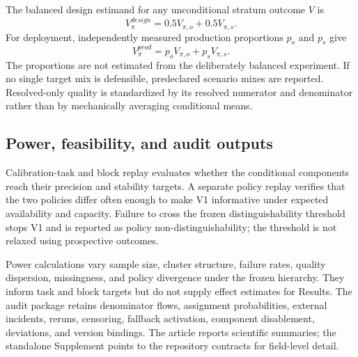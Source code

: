 The balanced design estimand for any unconditional stratum outcome $V$ is
\begin{equation}
 V_\pi^{design}=0.5V_{\pi,o}+0.5V_{\pi,s}.
 \label{eq:designstandard}
\end{equation}
For deployment, independently measured production proportions $p_o$ and $p_s$ give
\begin{equation}
 V_\pi^{prod}=p_oV_{\pi,o}+p_sV_{\pi,s}.
 \label{eq:prodstandard}
\end{equation}
The proportions are not estimated from the deliberately balanced experiment. If no single target mix is defensible, predeclared scenario mixes are reported. Resolved-only quality is standardized by its resolved numerator and denominator rather than by mechanically averaging conditional means.

\subsection{Power, feasibility, and audit outputs}

Calibration-task and block replay evaluates whether the conditional components reach their precision and stability targets. A separate policy replay verifies that the two policies differ often enough to make V1 informative under expected availability and capacity. Failure to cross the frozen distinguishability threshold stops V1 and is reported as policy non-distinguishability; the threshold is not relaxed using prospective outcomes.

Power calculations vary sample size, cluster structure, failure rates, quality dispersion, missingness, and policy divergence under the frozen hierarchy. They inform task and block targets but do not supply effect estimates for Results. The audit package retains denominator flows, assignment probabilities, external incidents, reruns, censoring, fallback activation, component disablement, deviations, and version bindings. The article reports scientific summaries; the standalone Supplement points to the repository contracts for field-level detail.
